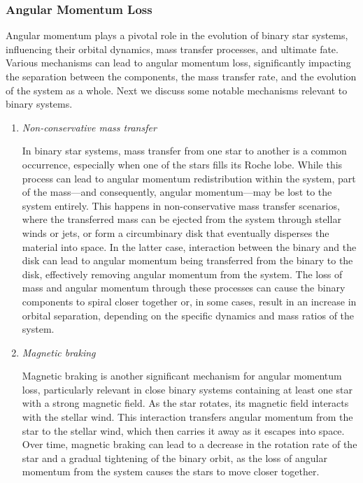 \documentclass[main.tex]{subfiles}
\begin{document}
    \subsubsection{Angular Momentum Loss}
    Angular momentum plays a pivotal role in the evolution of binary star systems, influencing their orbital dynamics, mass transfer processes, and ultimate fate. Various mechanisms can lead to angular momentum loss, significantly impacting the separation between the components, the mass transfer rate, and the evolution of the system as a whole. Next we discuss some notable mechanisms relevant to binary systems.
    \begin{enumerate}
        \item \textit{Non-conservative mass transfer}
        
        In binary star systems, mass transfer from one star to another is a common occurrence, especially when one of the stars fills its Roche lobe. While this process can lead to angular momentum redistribution within the system, part of the mass---and consequently, angular momentum---may be lost to the system entirely. This happens in non-conservative mass transfer scenarios, where the transferred mass can be ejected from the system through stellar winds or jets, or form a circumbinary disk that eventually disperses the material into space. In the latter case, interaction between the binary and the disk can lead to angular momentum being transferred from the binary to the disk, effectively removing angular momentum from the system. The loss of mass and angular momentum through these processes can cause the binary components to spiral closer together or, in some cases, result in an increase in orbital separation, depending on the specific dynamics and mass ratios of the system.

        \item \textit{Magnetic braking}

        Magnetic braking is another significant mechanism for angular momentum loss, particularly relevant in close binary systems containing at least one star with a strong magnetic field. As the star rotates, its magnetic field interacts with the stellar wind. This interaction transfers angular momentum from the star to the stellar wind, which then carries it away as it escapes into space. Over time, magnetic braking can lead to a decrease in the rotation rate of the star and a gradual tightening of the binary orbit, as the loss of angular momentum from the system causes the stars to move closer together.


\end{enumerate}
\end{document}
